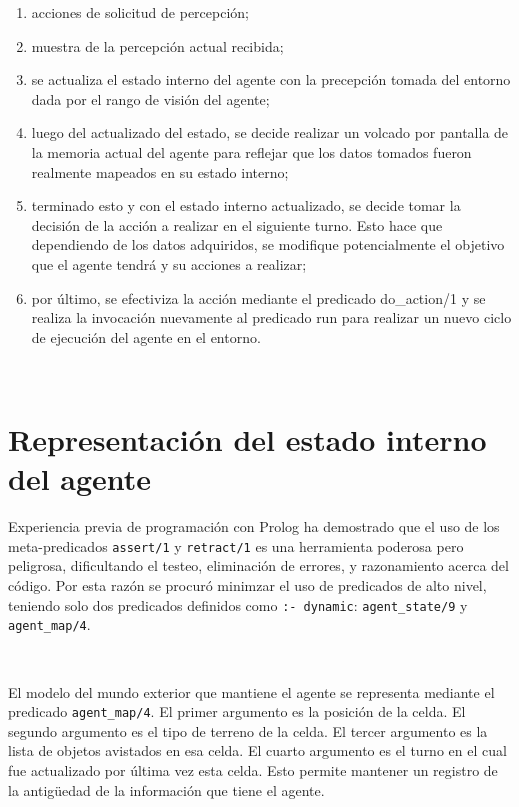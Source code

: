 \documentclass[a4paper,12pt]{report}
\begin{document}
\begin{enumerate}
\item acciones de solicitud de percepci\'{o}n;
\item muestra de la percepci\'{o}n actual recibida;
\item se actualiza el estado interno del agente con la precepci\'{o}n tomada del entorno dada por 
      el rango de visi\'{o}n del agente;
\item luego del actualizado del estado, se decide realizar un volcado por pantalla de la memoria 
      actual del agente para reflejar que los datos tomados fueron realmente mapeados en su estado 
      interno;
\item terminado esto y con el estado interno actualizado, se decide tomar la decisi\'{o}n de la 
      acci\'{o}n a realizar en el siguiente turno. 
      Esto hace que dependiendo de los datos adquiridos, se modifique potencialmente el objetivo 
      que el agente tendr\'{a} y su acciones a realizar;
\item por \'{u}ltimo, se efectiviza la acci\'{o}n mediante el predicado do\_action/1 y se realiza la 
      invocaci\'{o}n nuevamente al predicado run para realizar un nuevo ciclo de ejecuci\'{o}n del 
      agente en el entorno.
\end{enumerate}

\ 

\chapter{Representaci\'{o}n del estado interno del agente}

Experiencia previa de programaci\'{o}n con Prolog ha demostrado que el uso de los meta-predicados 
\texttt{assert/1} y \texttt{retract/1} es una herramienta poderosa pero peligrosa, dificultando el 
testeo, eliminaci\'{o}n de errores, y razonamiento acerca del c\'{o}digo. 
Por esta raz\'{o}n se procur\'{o} minimzar el uso de predicados de alto nivel, teniendo solo dos 
predicados definidos como \texttt{:- dynamic}: \texttt{agent\_state/9} y \texttt{agent\_map/4}.

\ 

El modelo del mundo exterior que mantiene el agente se representa mediante el predicado 
\texttt{agent\_map/4}.
El primer argumento es la posici\'{o}n de la celda.
El segundo argumento es el tipo de terreno de la celda.
El tercer argumento es la lista de objetos avistados en esa celda. 
El cuarto argumento es el turno en el cual fue actualizado por \'{u}ltima vez esta celda. 
Esto permite mantener un registro de la antig\"{u}edad de la informaci\'{o}n que tiene el agente. 
\end{document}
